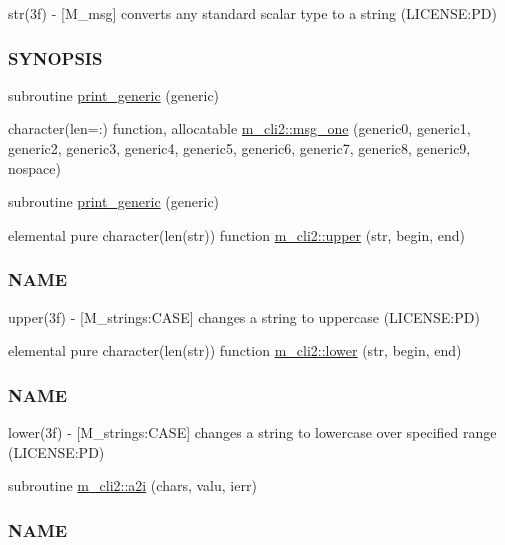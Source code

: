 \begin{DoxyCompactItemize}
\begin{DoxyCompactList}
str(3f) -\/ \mbox{[}M\+\_\+msg\mbox{]} converts any standard scalar type to a string (L\+I\+C\+E\+N\+SE\+:PD) \subsubsection*{S\+Y\+N\+O\+P\+S\+IS}\end{DoxyCompactList}\item 
subroutine \mbox{\hyperlink{M__CLI2_8f90_aaa8ee15f943d8e1543ae35ab732c3cd2}{print\+\_\+generic}} (generic)
\item 
character(len=\+:) function, allocatable \mbox{\hyperlink{namespacem__cli2_a368e9aaa556f69228e7f0837bd558b82}{m\+\_\+cli2\+::msg\+\_\+one}} (generic0, generic1, generic2, generic3, generic4, generic5, generic6, generic7, generic8, generic9, nospace)
\item 
subroutine \mbox{\hyperlink{M__CLI2_8f90_a9d5e1620d474ac03a74eeb9b0f7d6ae1}{print\+\_\+generic}} (generic)
\item 
elemental pure character(len(str)) function \mbox{\hyperlink{namespacem__cli2_afa7a2419002024ff6d950c5d905ddd7a}{m\+\_\+cli2\+::upper}} (str, begin, end)
\begin{DoxyCompactList}\small\item\em \subsubsection*{N\+A\+ME}

upper(3f) -\/ \mbox{[}M\+\_\+strings\+:C\+A\+SE\mbox{]} changes a string to uppercase (L\+I\+C\+E\+N\+SE\+:PD) \end{DoxyCompactList}\item 
elemental pure character(len(str)) function \mbox{\hyperlink{namespacem__cli2_a6d2d93ab8471667e632bf7a0e95ebd13}{m\+\_\+cli2\+::lower}} (str, begin, end)
\begin{DoxyCompactList}\small\item\em \subsubsection*{N\+A\+ME}

lower(3f) -\/ \mbox{[}M\+\_\+strings\+:C\+A\+SE\mbox{]} changes a string to lowercase over specified range (L\+I\+C\+E\+N\+SE\+:PD) \end{DoxyCompactList}\item 
subroutine \mbox{\hyperlink{namespacem__cli2_a0be58233adafc0bf10dfe69300a05b9f}{m\+\_\+cli2\+::a2i}} (chars, valu, ierr)
\begin{DoxyCompactList}\small\item\em \subsubsection*{N\+A\+ME}


\end{DoxyCompactList}
\end{DoxyCompactItemize}

